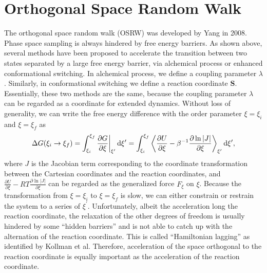 \section{Orthogonal Space Random Walk\label{Sec:ES:OSRW}}
The orthogonal space random walk (OSRW) was developed by Yang in 2008.\cite{ZhengPNAS2008}
Phase space sampling is always hindered by free energy barriers. As shown above, several methods have been proposed to accelerate the transition between two states separated by a large free energy barrier, via alchemical process or enhanced conformational switching. In alchemical process, we define a coupling parameter $\lambda$. Similarly, in conformational switching we define a reaction coordinate $\mathbf{S}$. Essentially, these two methods are the same, because the coupling parameter $\lambda$ can be regarded as a coordinate for extended dynamics. Without loss of generality, we can write the free energy difference with the order parameter $\xi=\xi_i$ and $\xi=\xi_f$ as
\begin{equation}
	\Delta G(\xi_i \rightarrow \xi_f)=\int_{\xi_i}^{\xi_f}\frac{\partial G}{\partial \xi}\bigg\rvert_{\xi^\prime} \mathop{}\!\mathrm{d}\xi^\prime=\int_{\xi_i}^{\xi_f}\left<\frac{\partial U}{\partial \xi}-\beta^{-1}\frac{\partial \ln{|J|}}{\partial \xi}\right>_{\xi^\prime}\mathop{}\!\mathrm{d}\xi^\prime,
\end{equation}
where $J$ is the Jacobian term corresponding to the coordinate transformation between the Cartesian coordinates and the reaction coordinates, and $\frac{\partial U}{\partial \xi}-RT\frac{\partial \ln{|J|}}{\partial \xi}$ can be regarded as the generalized force $F_\xi$ on $\xi$. Because the transformation from $\xi=\xi_i$ to $\xi=\xi_f$ is slow, we can either constrain or restrain the system to a series of $\xi^\prime$. Unfortunately, albeit the acceleration long the reaction coordinate, the relaxation of the other degrees of freedom is usually hindered by some ``hidden barriers'' and is not able to catch up with the alternation of the reaction coordinate. This is called ``Hamiltonian lagging'' as identified by Kollman et al.\cite{PearlmanJCP1989} Therefore, acceleration of the space orthogonal to the reaction coordinate is equally important as the acceleration of the reaction coordinate.

